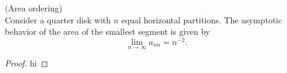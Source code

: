 \begin{Lemma}(Area ordering) \\
Consider a quarter disk with $n$ equal horizontal partitions. The asymptotic behavior of the area of the smallest segment is given by
\begin{equation}
  \lim_{n\to\infty} a_{nn} = n^{-2}.
\end{equation}
\end{Lemma}
%
\begin{proof}
hi
\end{proof}


\endinput %
